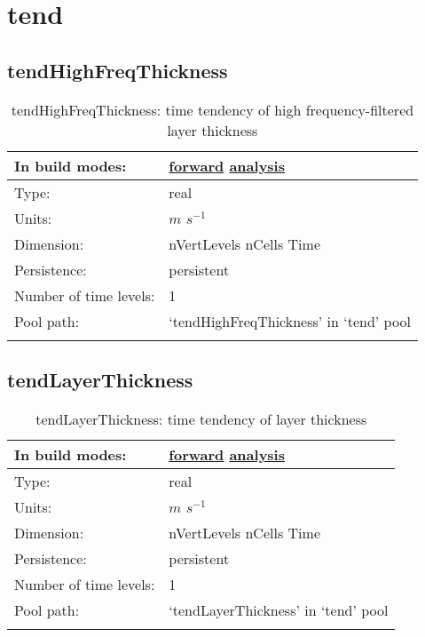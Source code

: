 \section[tend]{tend}
\label{sec:var_sec_tend}
\subsection[tendHighFreqThickness]{tendHighFreqThickness}
\label{subsec:var_sec_tend_tendHighFreqThickness}
\begin{center}
\begin{longtable}{| p{2.0in} | p{4.0in} |}
        \hline 
        In build modes: & \hyperref[subsec:forward_var_tab_tend]{forward} \hyperref[subsec:analysis_var_tab_tend]{analysis} \\
        \hline 
        Type: & real \\
        \hline 
        Units: & $m$ $s^{-1}$ \\
        \hline 
        Dimension: & nVertLevels nCells Time \\
        \hline 
        Persistence: & persistent \\
        \hline 
        Number of time levels: & 1 \\
        \hline 
            Pool path: & `tendHighFreqThickness' in `tend' pool \\
		 \hline 
    \caption{tendHighFreqThickness: time tendency of high frequency-filtered layer thickness}
\end{longtable}
\end{center}
\subsection[tendLayerThickness]{tendLayerThickness}
\label{subsec:var_sec_tend_tendLayerThickness}
\begin{center}
\begin{longtable}{| p{2.0in} | p{4.0in} |}
        \hline 
        In build modes: & \hyperref[subsec:forward_var_tab_tend]{forward} \hyperref[subsec:analysis_var_tab_tend]{analysis} \\
        \hline 
        Type: & real \\
        \hline 
        Units: & $m$ $s^{-1}$ \\
        \hline 
        Dimension: & nVertLevels nCells Time \\
        \hline 
        Persistence: & persistent \\
        \hline 
        Number of time levels: & 1 \\
        \hline 
            Pool path: & `tendLayerThickness' in `tend' pool \\
		 \hline 
    \caption{tendLayerThickness: time tendency of layer thickness}
\end{longtable}
\end{center}
